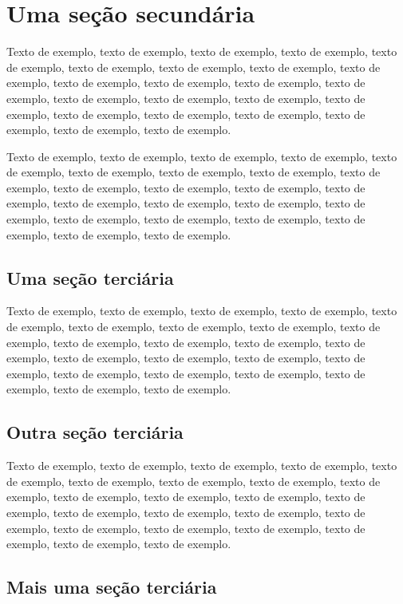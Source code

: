 \documentclass[
	12pt,				%
	oneside,			%
	a4paper,			%
	english,			%
	brazil				%
	]{abntex2ppgsi}
\begin{document}
\section{Uma seção secundária}

Texto de exemplo, texto de exemplo, texto de exemplo, texto de exemplo, texto de exemplo, texto de exemplo, texto de exemplo, texto de exemplo, texto de exemplo, texto de exemplo, texto de exemplo, texto de exemplo, texto de exemplo, texto de exemplo, texto de exemplo, texto de exemplo, texto de exemplo, texto de exemplo, texto de exemplo, texto de exemplo, texto de exemplo, texto de exemplo, texto de exemplo.

Texto de exemplo, texto de exemplo, texto de exemplo, texto de exemplo, texto de exemplo, texto de exemplo, texto de exemplo, texto de exemplo, texto de exemplo, texto de exemplo, texto de exemplo, texto de exemplo, texto de exemplo, texto de exemplo, texto de exemplo, texto de exemplo, texto de exemplo, texto de exemplo, texto de exemplo, texto de exemplo, texto de exemplo, texto de exemplo, texto de exemplo.

\subsection{Uma seção terciária}

Texto de exemplo, texto de exemplo, texto de exemplo, texto de exemplo, texto de exemplo, texto de exemplo, texto de exemplo, texto de exemplo, texto de exemplo, texto de exemplo, texto de exemplo, texto de exemplo, texto de exemplo, texto de exemplo, texto de exemplo, texto de exemplo, texto de exemplo, texto de exemplo, texto de exemplo, texto de exemplo, texto de exemplo, texto de exemplo, texto de exemplo.


\subsection{Outra seção terciária}

Texto de exemplo, texto de exemplo, texto de exemplo, texto de exemplo, texto de exemplo, texto de exemplo, texto de exemplo, texto de exemplo, texto de exemplo, texto de exemplo, texto de exemplo, texto de exemplo, texto de exemplo, texto de exemplo, texto de exemplo, texto de exemplo, texto de exemplo, texto de exemplo, texto de exemplo, texto de exemplo, texto de exemplo, texto de exemplo, texto de exemplo.

\subsection{Mais uma seção terciária}
\end{document}

